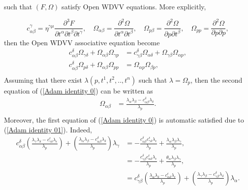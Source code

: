 \documentclass{article}
\theoremstyle{definition}
\begin{document}
such that $(F, \Omega)$ satisfy Open WDVV equations. More explicitly, 

\begin{equation*}
c_{\alpha\beta}^{\gamma}=\eta^{\gamma\mu}\frac{\partial^3 F}{\partial t^{\alpha}\partial t^{\beta}\partial t^{\gamma}}, \quad \Omega_{\alpha\beta}=\frac{\partial^2 \Omega}{\partial t^{\alpha}\partial t^{\beta}}, \quad \Omega_{p\beta}=\frac{\partial^2 \Omega}{\partial p\partial t^{\beta}}, \quad \Omega_{pp}=\frac{\partial^2 \Omega}{\partial p\partial p},
\end{equation*}
then the Open WDVV associative equation become
\begin{equation}\label{Adam identity 0}
\begin{split}
c_{\alpha\beta}^{\delta}\Omega_{\gamma\delta}+\Omega_{\alpha\beta}\Omega_{\gamma p}&=c_{\gamma\beta}^{\delta}\Omega_{\alpha\delta}+\Omega_{\gamma\beta}\Omega_{\alpha p},\\
c_{\alpha\beta}^{\delta}\Omega_{p \delta}+\Omega_{\alpha\beta}\Omega_{p p}&=\Omega_{\alpha p}\Omega_{\beta p},\\
\end{split}
\end{equation}
Assuming that there exist $\lambda(p,t^1,t^2,..,t^n)$ such that $\lambda = \Omega_p$, then the second equation of (\ref{Adam identity 0}) can be written as
\begin{equation}\label{Adam identity 01}
\begin{split}
\Omega_{\alpha\beta}&=\frac{\lambda_{\alpha }\lambda_{\beta}-c_{\alpha\beta}^{\delta}\lambda_{\delta}}{\lambda_{p}} .\\
\end{split}
\end{equation}
Moreover, the first equation of (\ref{Adam identity 0}) is automatic satisfied due to (\ref{Adam identity 01}). Indeed,
\begin{equation*}
\begin{split}
c_{\alpha\beta}^{\delta}\left(\frac{\lambda_{\gamma }\lambda_{\delta}-c_{\gamma\delta}^{\epsilon}\lambda_{\epsilon}}{\lambda_{p}}  \right)+\left(\frac{\lambda_{\alpha }\lambda_{\beta}-c_{\alpha\beta}^{\delta}\lambda_{\delta}}{\lambda_{p}}\right)\lambda_{\gamma}&=-\frac{c_{\alpha\beta}^{\delta}c_{\gamma\delta}^{\epsilon}\lambda_{\epsilon}}{\lambda_p}+\frac{\lambda_{\alpha}\lambda_{\beta}\lambda_{\gamma}}{\lambda_p},\\
&=-\frac{c_{\gamma\beta}^{\delta}c_{\alpha\delta}^{\epsilon}\lambda_{\epsilon}}{\lambda_p}+\frac{\theta_{\alpha}\lambda_{\beta}\lambda_{\gamma}}{\lambda_p},\\
&=c_{\gamma\beta}^{\delta}\left(\frac{\lambda_{\alpha }\lambda_{\delta}-c_{\alpha\delta}^{\epsilon}\lambda_{\epsilon}}{\lambda_{p}}  \right)+\left(\frac{\lambda_{\gamma }\lambda_{\beta}-c_{\gamma\beta}^{\delta}\lambda_{\delta}}{\lambda_{p}}\right)\lambda_{\alpha}.
\end{split}
\end{equation*}
\end{document}
